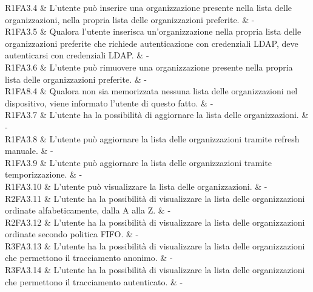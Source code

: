 R1FA3.4 & L’utente può inserire una organizzazione presente nella lista delle organizzazioni, nella propria lista delle organizzazioni preferite.  & - \\

R1FA3.5 & Qualora l’utente inserisca un'organizzazione nella propria lista delle organizzazioni preferite che richiede autenticazione con credenziali LDAP, deve autenticarsi con credenziali LDAP. & - \\

R1FA3.6 & L’utente può rimuovere una organizzazione presente nella propria lista delle organizzazioni preferite.  & - \\

R1FA8.4 & Qualora non sia memorizzata nessuna lista delle organizzazioni nel dispositivo, viene informato l’utente di questo fatto.  & - \\

R1FA3.7 & L’utente ha la possibilità di aggiornare la lista delle organizzazioni.  & - \\

R1FA3.8 & L’utente può aggiornare la lista delle organizzazioni tramite refresh manuale.  & - \\

R1FA3.9 & L’utente può aggiornare la lista delle organizzazioni tramite temporizzazione. & - \\

R1FA3.10 & L’utente può visualizzare la lista delle organizzazioni. & - \\

R2FA3.11 & L’utente ha la possibilità di visualizzare la lista delle organizzazioni ordinate alfabeticamente, dalla A alla Z.  & - \\

R2FA3.12 & L’utente ha la possibilità di visualizzare la lista delle organizzazioni ordinate secondo politica FIFO.  & - \\

R3FA3.13 & L’utente ha la possibilità di visualizzare la lista delle organizzazioni che permettono il tracciamento anonimo. & - \\

R3FA3.14 & L’utente ha la possibilità di visualizzare la lista delle organizzazioni che permettono il tracciamento autenticato.  & - \\

